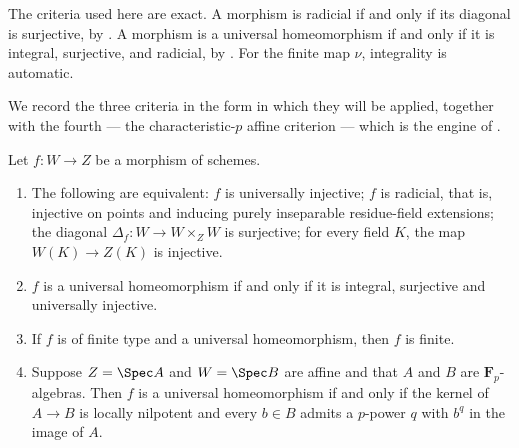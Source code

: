 The criteria used here are exact.
A morphism is radicial if and only if its diagonal is surjective, by
\cite[\href{https://stacks.math.columbia.edu/tag/01S4}{Tag 01S4}]
{stacks-project}.
A morphism is a universal homeomorphism if and only if it is integral,
surjective, and radicial, by
\cite[\href{https://stacks.math.columbia.edu/tag/04DF}{Tag 04DF}]
{stacks-project}.
For the finite map $\nu$, integrality is automatic.

We record the three criteria in the form in which they will be applied,
together with the fourth --- the characteristic-$p$ affine criterion ---
which is the engine of .

\begin{proposition}
\label{prop:ch43-criteria}
Let $f:W\to Z$ be a morphism of schemes.
\begin{enumerate}
\item\label{itm:ch43-crit:radicial}
      The following are equivalent: $f$ is universally injective;
      $f$ is radicial, that is, injective on points and inducing purely
      inseparable residue-field extensions; the diagonal
      $\Delta_f:W\to W\times_ZW$ is surjective; for every field $K$, the
      map $W(K)\to Z(K)$ is injective.
\item\label{itm:ch43-crit:uh}
      $f$ is a universal homeomorphism if and only if it is integral,
      surjective and universally injective.
\item\label{itm:ch43-crit:finite}
      If $f$ is of finite type and a universal homeomorphism, then $f$
      is finite.
\item\label{itm:ch43-crit:charp}
      Suppose $Z=\Spec A$ and $W=\Spec B$ are affine and that $A$ and
      $B$ are $\mathbf F_p$-algebras.  Then $f$ is a universal
      homeomorphism if and only if the kernel of $A\to B$ is locally
      nilpotent and every $b\in B$ admits a $p$-power $q$ with
      $b^q$ in the image of $A$.
\end{enumerate}
\end{proposition}

